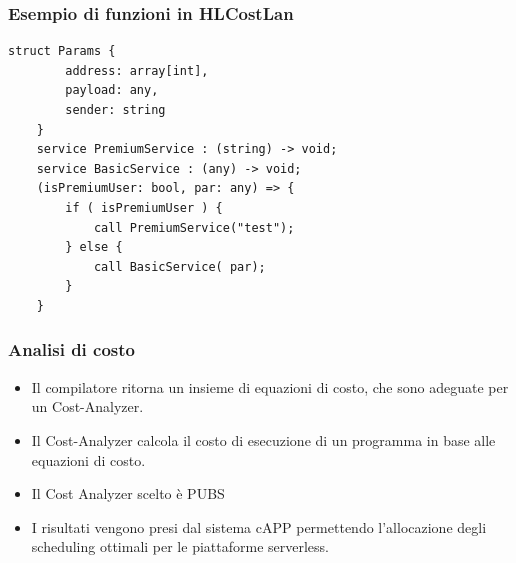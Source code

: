 \documentclass[xcolor=dvipsnames]{beamer}
\begin{document}
\begin{frame}[fragile]
    \frametitle{Esempio di funzioni in HLCostLan}
    \begin{lstlisting}[language=HLCostLan, caption={Listing8}]
    struct Params {
        address: array[int],
        payload: any,
        sender: string
    }
    service PremiumService : (string) -> void;
    service BasicService : (any) -> void;
    (isPremiumUser: bool, par: any) => {
        if ( isPremiumUser ) {
            call PremiumService("test");
        } else {
            call BasicService( par);
        }
    }
    \end{lstlisting}
\end{frame}

\begin{frame}
    \frametitle{Analisi di costo}
    \begin{itemize}
        \item Il compilatore ritorna un insieme di equazioni di costo, che sono adeguate per un Cost-Analyzer.
        \item Il Cost-Analyzer calcola il costo di esecuzione di un programma in base alle equazioni di costo.
        \item Il Cost Analyzer scelto è PUBS
        \item I risultati vengono presi dal sistema cAPP permettendo l'allocazione degli scheduling ottimali per le piattaforme serverless.
    \end{itemize}
    
\end{frame}
\end{document}
